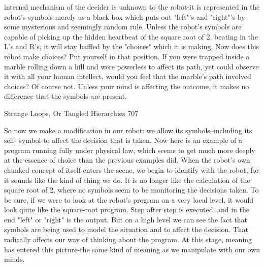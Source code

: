 internal mechanism of the decider is unknown to the robot-it is represented in the robot's
symbols merely as a black box which puts out "left"'s and "right"'s by some mysterious
and seemingly random rule. Unless the robot's symbols are capable of picking up the
hidden heartbeat of the square root of 2, beating in the L's and R's, it will stay baffled by
the "choices" which it is making. Now does this robot make choices? Put yourself in that
position. If you were trapped inside a marble rolling down a hill and were powerless to
affect its path, yet could observe it with all your human intellect, would you feel that the
marble's path involved choices? Of course not. Unless your mind is affecting the
outcome, it makes no difference that the symbols are present.




Strange Loops, Or Tangled Hierarchies                                                    707

So now we make a modification in our robot: we allow its symbols--including its self-
symbol-to affect the decision that is taken. Now here is an example of a program running
fully under physical law, which seems to get much more deeply at the essence of choice
than the previous examples did. When the robot's own chunked concept of itself enters
the scene, we begin to identify with the robot, for it sounds like the kind of thing we do. It
is no longer like the calculation of the square root of 2, where no symbols seem to be
monitoring the decisions taken. To be sure, if we were to look at the robot's program on a
very local level, it would look quite like the square-root program. Step after step is
executed, and in the end "left" or "right" is the output. But on a high level we can see the
fact that symbols are being used to model the situation and to affect the decision. That
radically affects our way of thinking about the program. At this stage, meaning has
entered this picture-the same kind of meaning as we manipulate with our own minds.


